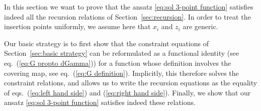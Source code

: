 \documentclass[12pt,a4paper]{article}
\begin{document}
In this section we want to prove that the ansatz \eqref{eq:sol 3-point function} satisfies indeed all the recursion relations of Section~\ref{sec:recursion}. In order to treat the  insertion points uniformly, we assume here that $x_i$ and $z_i$ are generic.

Our basic strategy is to first show that the constraint equations of Section~\ref{sec:basic strategy} can be reformulated as a functional identity (see eq.~(\ref{eq:G propto dGamma})) for a function whose definition involves the covering map, see eq.~(\ref{eq:G definition}). Implicitly, this therefore solves the constraint relations, and allows us to write the recursion equations as the equality of eqs.~(\ref{eq:left hand side}) and (\ref{eq:right hand side}). Finally, we show that our ansatz \eqref{eq:sol 3-point function} satisfies indeed these relations.
\smallskip
\end{document}
